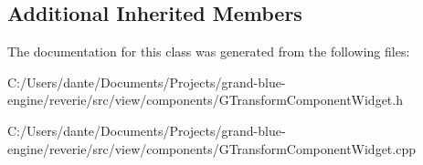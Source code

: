 \subsection*{Additional Inherited Members}


The documentation for this class was generated from the following files\+:\begin{DoxyCompactItemize}
\item 
C\+:/\+Users/dante/\+Documents/\+Projects/grand-\/blue-\/engine/reverie/src/view/components/G\+Transform\+Component\+Widget.\+h\item 
C\+:/\+Users/dante/\+Documents/\+Projects/grand-\/blue-\/engine/reverie/src/view/components/G\+Transform\+Component\+Widget.\+cpp\end{DoxyCompactItemize}
